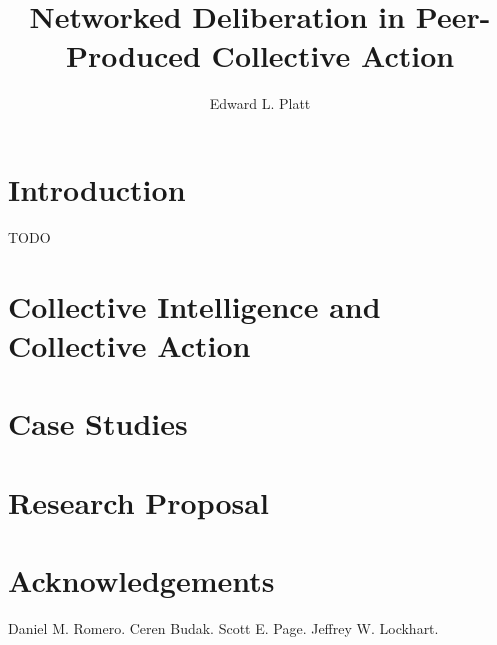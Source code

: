 \documentclass{book}
\author{Edward L. Platt}
\title{Networked Deliberation in Peer-Produced Collective Action}
\begin{document}
\maketitle

\tableofcontents

\chapter{Introduction}
TODO

\chapter[Coll. Intelligence \& Coll. Action]{Collective Intelligence and Collective Action}


\chapter{Case Studies}


\chapter{Research Proposal}


\chapter*{Acknowledgements}
Daniel M. Romero.
Ceren Budak.
Scott E. Page.
Jeffrey W. Lockhart.



\end{document}
